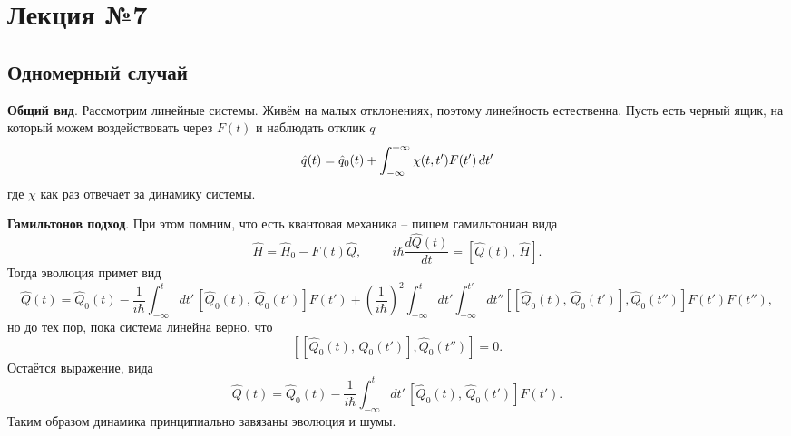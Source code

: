 \section{Лекция №7}






\subsection{Одномерный случай}



\textbf{Общий вид}. Рассмотрим линейные системы. Живём на малых отклонениях, поэтому линейность естественна. 
Пусть есть черный ящик, на который можем воздействовать через $F(t)$ и наблюдать отклик $q$
\begin{equation}
	\hat{q}(t) = \hat{q}_0 (t) + \int_{-\infty}^{+\infty} \chi(t, t') F(t') \, d t'
	\label{7_I}
\end{equation}
где $\chi$ как раз отвечает за динамику системы.

\textbf{Гамильтонов подход}. При этом помним, что есть квантовая механика -- пишем гамильтониан вида
\begin{equation*}
	\hat{H} = \hat{H}_0 - F(t) \hat{Q},
	\hspace{1cm}
	i \hbar \frac{d \hat{Q}(t)}{d t} = \left[\hat{Q}(t),\, \hat{H}\right].
\end{equation*}
Тогда эволюция примет вид
\begin{equation*}
	\hat{Q}(t) = \hat{Q}_0 (t) - \frac{1}{i\hbar} \int_{-\infty}^{t}d t'\, \left[
		\hat{Q}_0(t),\, \hat{Q}_0(t')
	\right] F(t')  + \left(\frac{1}{i\hbar}\right)^2 \int_{-\infty}^{t} dt'\int_{-\infty}^{t'} dt'' \left[
		\left[
			\hat{Q}_0(t),\, \hat{Q}_0(t')
		\right], 
		\hat{Q}_0 (t'')
	\right] F(t') F(t''),
\end{equation*}
но до тех пор, пока система линейна верно, что
\begin{equation*}
	\left[
		\left[
			\hat{Q}_0(t),\, \hat{Q}_0(t')
		\right], 
		\hat{Q}_0 (t'')
	\right] = 0.
\end{equation*}
Остаётся выражение, вида
\begin{equation}
	\hat{Q}(t) = \hat{Q}_0 (t) - \frac{1}{i\hbar} \int_{-\infty}^{t}d t'\, \left[
		\hat{Q}_0(t),\, \hat{Q}_0(t')
	\right] F(t').
	\label{7_II}
\end{equation}
Таким образом динамика принципиально завязаны эволюция и шумы. 

